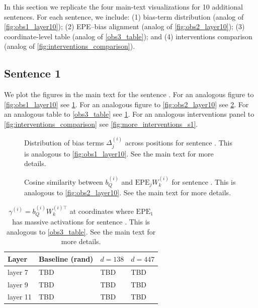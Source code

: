 \documentclass[11pt]{article}
\newif\ifYRMcomments
\newcommand{\YRM}[1]{\ifYRMcomments\textcolor{red}{[YRM: #1]}\fi}
\begin{document}
In this section we replicate the four main-text visualizations for 10 additional sentences. For each sentence, we include: (1) bias-term distribution (analog of \cref{fig:obs1_layer10}); (2) EPE--bias alignment (analog of \cref{fig:obs2_layer10}); (3) coordinate-level table (analog of \cref{obs3_table}); and (4) interventions comparison (analog of \cref{fig:interventions_comparison}). 

\subsection{Sentence 1}
We plot the figures in the main text for the sentence \YRM{add sentence number 1 here}. For an analogous figure to \cref{fig:obs1_layer10} see \cref{fig:more_obs1_s1}. For an analogous figure to \cref{fig:obs2_layer10} see \cref{fig:more_obs2_s1}. For an analogous table to \cref{obs3_table} see \cref{tab:more_obs3_s1}. For an analogous interventions panel to \cref{fig:interventions_comparison} see \cref{fig:more_interventions_s1}.

\begin{figure}[t]
   \centering
   \caption{Distribution of bias terms $\Delta_j^{(i)}$ across positions for sentence \YRM{add sentence number 1 here}. This is analogous to \cref{fig:obs1_layer10}. See the main text for more details.}
   \label{fig:more_obs1_s1}
 \end{figure}
 
 \begin{figure}[t]
   \centering
   \caption{Cosine similarity between $b_Q^{(i)}$ and $\mathrm{EPE}_j W_k^{(i)}$ for sentence \YRM{add sentence number 1 here}. This is analogous to \cref{fig:obs2_layer10}. See the main text for more details.}
   \label{fig:more_obs2_s1}
 \end{figure}
 
 \begin{table}[t]
   \centering
   \begin{tabular}{llll}
     \hline
     \textbf{Layer} & \textbf{Baseline (rand)} & \textbf{$d{=}138$} & \textbf{$d{=}447$}\\
     \hline
     layer 7   &   TBD    &    TBD   &    TBD         \\
     layer 9   &   TBD    &    TBD   &    TBD         \\
     layer 11  &   TBD    &    TBD   &    TBD         \\
     \hline
   \end{tabular}
   \caption{$\gamma^{(i)}{=}b_Q^{(i)}W_k^{(i)\top}$ at coordinates where $\mathrm{EPE}_1$ has massive activations for sentence \YRM{add sentence number 1 here}. This is analogous to \cref{obs3_table}. See the main text for more details.}
   \label{tab:more_obs3_s1}
 \end{table}
 
\end{document}
